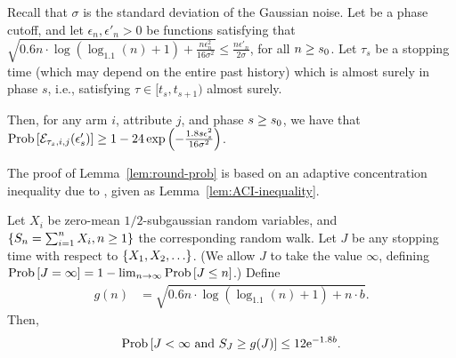 \begin{lemma} \label{lem:round-prob}
Recall that $\sigma$ is the standard deviation of the Gaussian noise.
Let \LatePhase be a phase cutoff, 
and let $\epsilon_n, \epsilon'_n > 0$ be functions satisfying that
$\sqrt{0.6 n \cdot \log (\log_{1.1}(n) + 1) + \frac{n \epsilon_n^2}{16 \sigma^2}}
\leq \frac{n \epsilon'_n}{2 \sigma}$,
for all $n \geq s_0$.
Let $\tau_s$ be a stopping time
(which may depend on the entire past history)
which is almost surely in phase $s$,
i.e., satisfying $\tau \in [t_s, t_{s+1})$ almost surely.

Then, for any arm $i$, attribute $j$, and phase $s \geq s_0$,
we have that
$\Prob{\AccE{\tau_s}{i}{j}{\epsilon'_s}}
\geq 1 - 24 \exp\left(-\frac{1.8 s \epsilon_s^2}{16 \sigma^2} \right)$.
\end{lemma}

The proof of Lemma~\ref{lem:round-prob} is based on an adaptive
concentration inequality due to \cite{zhao2016adaptive},
given as Lemma~\ref{lem:ACI-inequality}.

\begin{lemma}
\label{lem:ACI-inequality}
Let $X_i$ be zero-mean $1/2$-subgaussian random variables,
and $\{ S_n = \sum_{i=1}^n X_i, n \geq 1 \}$ the corresponding random walk.
Let $J$ be any stopping time with respect to $\{ X_1, X_2, \ldots \}$.
(We allow $J$ to take the value $\infty$,
defining $\Prob{J = \infty} = 1 - \lim_{n \to \infty} \Prob{J \leq n}$.)
Define 
\begin{align*}
g(n) & = \sqrt{0.6 n \cdot \log (\log_{1.1}(n) + 1) + n \cdot b}.
\end{align*}
Then, 
\begin{align*}
\Prob{J < \infty \mbox{ and } S_J \geq g(J)} \leq 12 \e^{-1.8 b}.
\end{align*}
\end{lemma}

